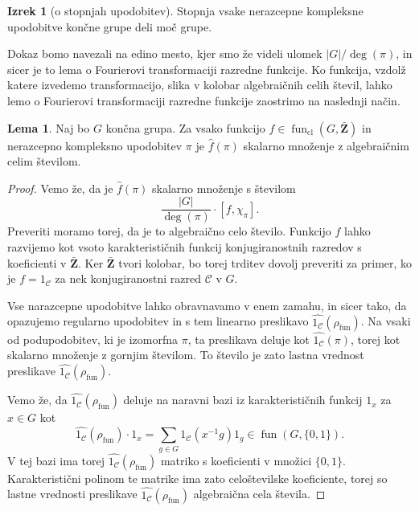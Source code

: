 \documentclass[11pt]{book}
\def\ZZ{\mathbf{Z}}
\def\conclass{\mathcal{C}}
\DeclareMathOperator\cl{cl}
\DeclareMathOperator\fun{fun}
\theoremstyle{definition}
\theoremstyle{zgled}
\theoremstyle{odprtproblem}
\theoremstyle{domacanaloga}
\newenvironment{dokaz}
    {\color{siva}\begin{proof}}
    {\end{proof}}
\theoremstyle{izrek}
\newtheorem*{izrek}{Izrek}
\newtheorem*{lema}{Lema}
\begin{document}
\begin{izrek}[o stopnjah upodobitev]
Stopnja vsake nerazcepne kompleksne upodobitve končne grupe deli moč grupe.
\end{izrek}

Dokaz bomo navezali na edino mesto, kjer smo že videli ulomek $|G|/\deg(\pi)$, in sicer je to lema o Fourierovi transformaciji razredne funkcije. Ko funkcija, vzdolž katere izvedemo transformacijo, slika v kolobar algebraičnih celih števil, lahko lemo o Fourierovi transformaciji razredne funkcije zaostrimo na naslednji način.

    \begin{lema}
    Naj bo $G$ končna grupa. Za vsako funkcijo $f \in \fun_{\cl}(G, \bar{\ZZ})$ in nerazcepno kompleksno upodobitev $\pi$ je $\hat{f}(\pi)$ skalarno množenje z algebraičnim celim številom.
    \end{lema}
    \begin{dokaz}
    Vemo že, da je $\hat{f}(\pi)$ skalarno množenje s številom
    \[
        \frac{|G|}{\deg(\pi)} \cdot [ f, \chi_{\pi} ].
    \]
    Preveriti moramo torej, da je to algebraično celo število. Funkcijo $f$ lahko razvijemo kot vsoto karakterističnih funkcij konjugiranostnih razredov s koeficienti v $\bar{\ZZ}$. Ker $\bar{\ZZ}$ tvori kolobar, bo torej trditev dovolj preveriti za primer, ko je $f = 1_{\conclass}$ za nek konjugiranostni razred $\conclass$ v $G$.
    
    Vse narazcepne upodobitve lahko obravnavamo v enem zamahu, in sicer tako, da opazujemo regularno upodobitev in s tem linearno preslikavo $\widehat{1_{\conclass}}(\rho_{\fun})$. Na vsaki od podupodobitev, ki je izomorfna $\pi$, ta preslikava deluje kot $\widehat{1_{\conclass}}(\pi)$, torej kot skalarno množenje z gornjim številom. To število je zato lastna vrednost preslikave $\widehat{1_{\conclass}}(\rho_{\fun})$.
    
    Vemo že, da $\widehat{1_{\conclass}}(\rho_{\fun})$ deluje na naravni bazi iz karakterističnih funkcij $1_x$ za $x \in G$ kot
    \[
        \widehat{1_{\conclass}}(\rho_{\fun}) \cdot 1_x = \sum_{g \in G} 1_{\conclass}(x^{-1} g) 1_g \in \fun(G, \{ 0, 1 \}).
    \]
    V tej bazi ima torej $\widehat{1_{\conclass}}(\rho_{\fun})$ matriko s koeficienti v množici $\{ 0, 1 \}$. Karakteristični polinom te matrike ima zato celoštevilske koeficiente, torej so lastne vrednosti preslikave $\widehat{1_{\conclass}}(\rho_{\fun})$ algebraična cela števila.
    \end{dokaz}
    
\end{document}
